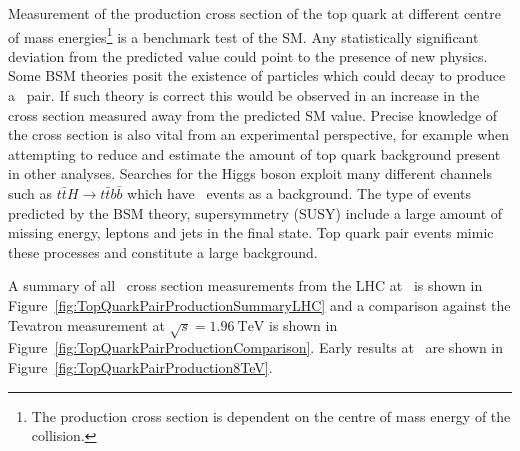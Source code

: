 Measurement of the production cross section of the top quark at different centre of mass energies\footnote{The production cross section is dependent on the centre of mass energy of the collision.} is a benchmark test of the SM. Any statistically significant deviation from the predicted value could point to the presence of new physics. Some BSM theories posit the existence of particles which could decay to produce a \ttbar\ pair. If such theory is correct this would be observed in an increase in the cross section measured away from the predicted SM value. Precise knowledge of the cross section is also vital from an experimental perspective, for example when attempting to reduce and estimate the amount of top quark background present in other analyses. Searches for the Higgs boson exploit many different channels such as $t\bar{t}H\rightarrow t\bar{t}b\bar{b}$ which have \ttbar\ events as a background. The type of events predicted by the BSM theory, supersymmetry (SUSY) include a large amount of missing energy, leptons and jets in the final state. Top quark pair events mimic these processes and constitute a large background.

A summary of all \ttbar\ cross section measurements from the LHC at \cmsS\ is shown in Figure~\ref{fig:TopQuarkPairProductionSummaryLHC} and a comparison against the Tevatron measurement at $\sqrt{s}=\SI{1.96}{\TeV}$ is shown in Figure~\ref{fig:TopQuarkPairProductionComparison}. Early results at \cmsE\ are shown in Figure~\ref{fig:TopQuarkPairProduction8TeV}.

